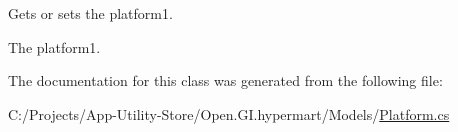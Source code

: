 Gets or sets the platform1. 

The platform1. 

The documentation for this class was generated from the following file\+:\begin{DoxyCompactItemize}
\item 
C\+:/\+Projects/\+App-\/\+Utility-\/\+Store/\+Open.\+G\+I.\+hypermart/\+Models/\hyperlink{_models_2_platform_8cs}{Platform.\+cs}\end{DoxyCompactItemize}
